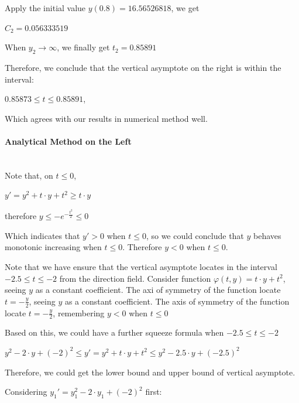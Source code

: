 \documentclass[11pt,a4paper]{article}
\begin{document}
\begin{multicols}{2}
	Apply the initial value $y(0.8) = 16.56526818$, we get 

	\begin{center}
		$C_2=0.056333519$
	\end{center}

	When $y_2 \rightarrow \infty$, we finally get $t_2=0.85891$

	Therefore, we conclude that the vertical asymptote on the right is within the interval:
	\begin{center}
		$0.85873 \leq t \leq 0.85891$,
	\end{center}
	 Which agrees with our results in numerical method well.

	\vfill\null
	\columnbreak

	\paragraph{\small Analytical Method on the Left} 

	~\\
	
	Note that, on $t \leq 0$,

	\begin{center}
		$y'=y^2+t \cdot y+t^2 \geq t \cdot y$

		therefore $y \leq -e^{-\frac{t^2}{2}} \leq 0$
	\end{center}
	Which indicates that $y' > 0$ when $t \leq 0$, so we could conclude that $y$ behaves monotonic increasing when $t \leq 0$. Therefore $y < 0$ when $t \leq 0$.

	Note that we have ensure that the vertical asymptote locates in the interval $-2.5 \leq t \leq -2$ from the direction field. Consider function $\varphi(t,y) = t \cdot y+t^2$, seeing $y$ as a constant coefficient. The axi of symmetry of the function locate $t=-\frac{y}{2}$, seeing $y$ as a constant coefficient. The axis of symmetry of the function locate $t= - \frac{y}{2}$, remembering $y<0$ when $t \leq 0$

	Based on this, we could have a further squeeze formula when $-2.5 \leq t \leq -2$

	\begin{center}
		$y^2-2 \cdot y+(-2)^2 \leq y' = y^2 + t \cdot y + t^2 \leq y^2 - 2.5 \cdot y + (-2.5)^2$
	\end{center}

	Therefore, we could get the lower bound and upper bound of vertical asymptote.

	Considering $y_1'=y_1^2-2 \cdot y_1+(-2)^2$ first:


\end{multicols}
\end{document}
